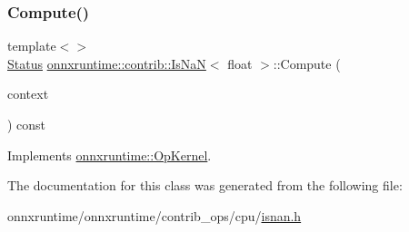 \mbox{\label{classonnxruntime_1_1contrib_1_1IsNaN_ad1f71b256793e672c6f9da4de46b0dbf}} 
\subsubsection{\texorpdfstring{Compute()}{Compute()}\hspace{0.1cm}{\footnotesize\ttfamily [2/2]}}
{\footnotesize\ttfamily template$<$$>$ \\
\mbox{\hyperlink{classonnxruntime_1_1common_1_1Status}{Status}} \mbox{\hyperlink{classonnxruntime_1_1contrib_1_1IsNaN}{onnxruntime\+::contrib\+::\+Is\+NaN}}$<$ float $>$\+::Compute (\begin{DoxyParamCaption}\item[{\mbox{\hyperlink{classonnxruntime_1_1OpKernelContext}{Op\+Kernel\+Context}} $\ast$}]{context }\end{DoxyParamCaption}) const\hspace{0.3cm}{\ttfamily [virtual]}}



Implements \mbox{\hyperlink{classonnxruntime_1_1OpKernel_a9eca8656a78b1b3ab9d3351a12798650}{onnxruntime\+::\+Op\+Kernel}}.



The documentation for this class was generated from the following file\+:\begin{DoxyCompactItemize}
\item 
onnxruntime/onnxruntime/contrib\+\_\+ops/cpu/\mbox{\hyperlink{isnan_8h}{isnan.\+h}}\end{DoxyCompactItemize}

